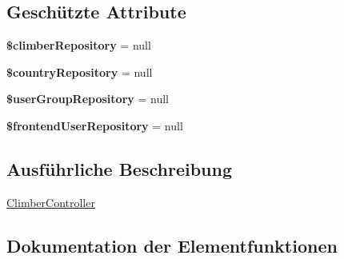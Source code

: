 \subsection*{Geschützte Attribute}
\begin{DoxyCompactItemize}
\item 
\mbox{\label{classCsp_1_1Pinkpoint_1_1Controller_1_1ClimberController_a01a2ae6da707769e9ff3ef87bbcc054f}} 
{\bfseries \$climber\+Repository} = null
\item 
\mbox{\label{classCsp_1_1Pinkpoint_1_1Controller_1_1ClimberController_a0afc6cf717c1748f3580403b7f70908a}} 
{\bfseries \$country\+Repository} = null
\item 
\mbox{\label{classCsp_1_1Pinkpoint_1_1Controller_1_1ClimberController_a6d113a99e3cadd32c792460ac690b730}} 
{\bfseries \$user\+Group\+Repository} = null
\item 
\mbox{\label{classCsp_1_1Pinkpoint_1_1Controller_1_1ClimberController_a8e6e74b8ac59ffac6e65c8051cfc48fe}} 
{\bfseries \$frontend\+User\+Repository} = null
\end{DoxyCompactItemize}


\subsection{Ausführliche Beschreibung}
\hyperlink{classCsp_1_1Pinkpoint_1_1Controller_1_1ClimberController}{Climber\+Controller} 

\subsection{Dokumentation der Elementfunktionen}
\mbox{\label{classCsp_1_1Pinkpoint_1_1Controller_1_1ClimberController_a9a94dc8991a74d5692a93354573b89c8}} 
